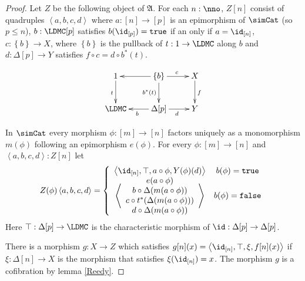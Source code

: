 \documentclass{tac}
\newcommand\set[1]{\left\{#1\right\}}
\newcommand\ri{^*}
\newcommand\of{:}
\newcommand\simplex\Delta
\newcommand\tuplet[1]{\left\langle #1 \right\rangle}
\newcommand\true{\mathtt{true}}
\newcommand\false{\mathtt{false}}
\newcommand\ambient{\mathfrak A}
\begin{document}
\begin{proof}
Let $Z$ be the following object of $\ambient$. For each $n\of\nno$, $Z[n]$ consist of quadruples $\tuplet{a,b,c,d}$ where 
 $a\of[n]\to [p]$ is an epimorphism of $\simCat$ (so $p\leq n$),
 $b\of\LDMC[p]$ satisfies $b(\id_{[p]})=\true$ if an only if $a=\id_{[n]}$,
 $c\of \set{b}\to X$, where $\set{b}$ is the pullback of $t\of 1\to\LDMC$ along $b$ and 
 $d\of \simplex[p]\to Y$ satisfies $f\circ c = d\circ b\ri(t)$.

\[\xymatrix{
1\ar[d]_t & \set b\ar[l]\ar[d]_{b\ri(t)}\ar[r]^{c} & X\ar[d]^f \\
\LDMC & \simplex[p]\ar[l]^b\ar[r]_d & Y
}\]

In $\simCat$ every morphism $\phi\of [m]\to[n]$ factors uniquely as a monomorphism $m(\phi)$ following an epimorphism $e(\phi)$. For every $\phi\of [m]\to [n]$ and $\tuplet{a,b,c,d}\of Z[n]$ let
\[ Z(\phi)\tuplet{a,b,c,d} = \left\{\begin{array}{cc}
\tuplet{\id_{[n]},\top,a\circ\phi,Y(\phi)(d)} & b(\phi)=\true \\
\tuplet{\begin{array}{c} e(a\circ \phi)\\ b\circ \simplex(m(a\circ \phi))\\ c \circ t\ri(\simplex(m(a\circ \phi)))\\ d\circ\simplex(m(a\circ \phi))\end{array}} & b(\phi)=\false
\end{array}\right.
\]
Here $\top\of \simplex[p]\to\LDMC$ is the characteristic morphism of $\id\of\simplex[p]\to\simplex[p]$.

There is a morphism $g\of X\to Z$ which satisfies $g[n](x) = \tuplet{\id_{[n]},\top,\xi,f[n](x)}$ if $\xi\of\simplex[n] \to X$ is the morphism that satisfies $\xi(\id_{[n]})=x$. The morphism $g$ is a cofibration by lemma \ref{Reedy}.


\end{proof}
\end{document}
